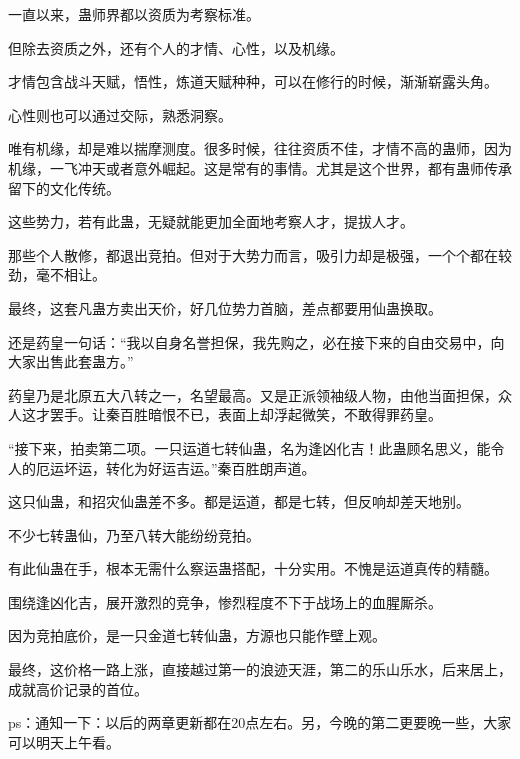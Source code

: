 \begin{this_body}
一直以来，蛊师界都以资质为考察标准。

但除去资质之外，还有个人的才情、心性，以及机缘。

才情包含战斗天赋，悟性，炼道天赋种种，可以在修行的时候，渐渐崭露头角。

心性则也可以通过交际，熟悉洞察。

唯有机缘，却是难以揣摩测度。很多时候，往往资质不佳，才情不高的蛊师，因为机缘，一飞冲天或者意外崛起。这是常有的事情。尤其是这个世界，都有蛊师传承留下的文化传统。

这些势力，若有此蛊，无疑就能更加全面地考察人才，提拔人才。

那些个人散修，都退出竞拍。但对于大势力而言，吸引力却是极强，一个个都在较劲，毫不相让。

最终，这套凡蛊方卖出天价，好几位势力首脑，差点都要用仙蛊换取。

还是药皇一句话：“我以自身名誉担保，我先购之，必在接下来的自由交易中，向大家出售此套蛊方。”

药皇乃是北原五大八转之一，名望最高。又是正派领袖级人物，由他当面担保，众人这才罢手。让秦百胜暗恨不已，表面上却浮起微笑，不敢得罪药皇。

“接下来，拍卖第二项。一只运道七转仙蛊，名为逢凶化吉！此蛊顾名思义，能令人的厄运坏运，转化为好运吉运。”秦百胜朗声道。

这只仙蛊，和招灾仙蛊差不多。都是运道，都是七转，但反响却差天地别。

不少七转蛊仙，乃至八转大能纷纷竞拍。

有此仙蛊在手，根本无需什么察运蛊搭配，十分实用。不愧是运道真传的精髓。

围绕逢凶化吉，展开激烈的竞争，惨烈程度不下于战场上的血腥厮杀。

因为竞拍底价，是一只金道七转仙蛊，方源也只能作壁上观。

最终，这价格一路上涨，直接越过第一的浪迹天涯，第二的乐山乐水，后来居上，成就高价记录的首位。

ps：通知一下：以后的两章更新都在20点左右。另，今晚的第二更要晚一些，大家可以明天上午看。

\end{this_body}

